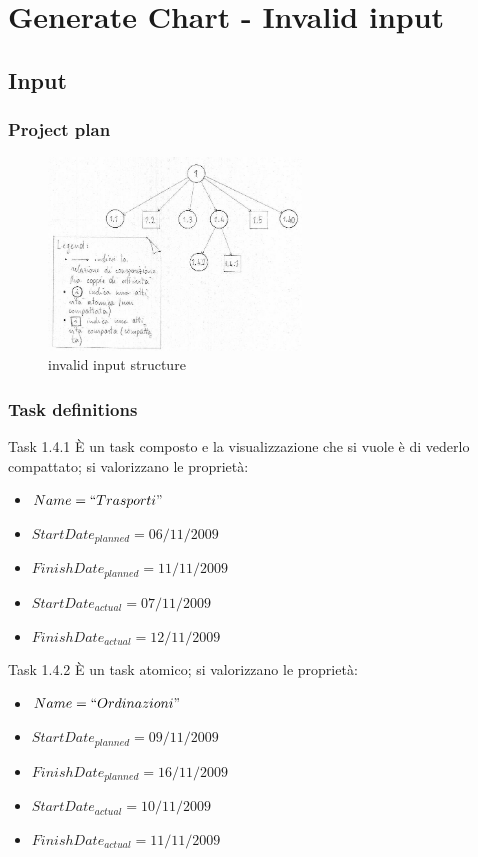 \chapter{Generate Chart - Invalid input}
\label{chap:genChartInvInput}

\section{Input}
\label{sec:generateGanttInvalidInput}
\subsection{Project plan}
\begin{figure}[h!] 
\centering
\includegraphics[width=0.6\textwidth]{case_spec/generate_Gantt/invalidInput.png}
\caption{invalid input structure}
\end{figure}

\subsection{Task definitions}
\begin{taksDef}{Task 1.4.1} \`E un task composto e la visualizzazione che si
vuole \`e di vederlo compattato; si valorizzano le propriet\`a:
\begin{itemize}
  \item $Name = ``Trasporti"$
  \item $StartDate_{planned} = 06/11/2009$
  \item $FinishDate_{planned} = 11/11/2009$
  \item $StartDate_{actual} = 07/11/2009$
  \item $FinishDate_{actual} = 12/11/2009$
\end{itemize}
\end{taksDef}

\begin{taksDef}{Task 1.4.2} \`E un task atomico; si valorizzano le propriet\`a:
\begin{itemize}
  \item $Name = ``Ordinazioni"$
  \item $StartDate_{planned} = 09/11/2009$
  \item $FinishDate_{planned} = 16/11/2009$
  \item $StartDate_{actual} = 10/11/2009$
  \item $FinishDate_{actual} = 11/11/2009$
\end{itemize}
\end{taksDef}

